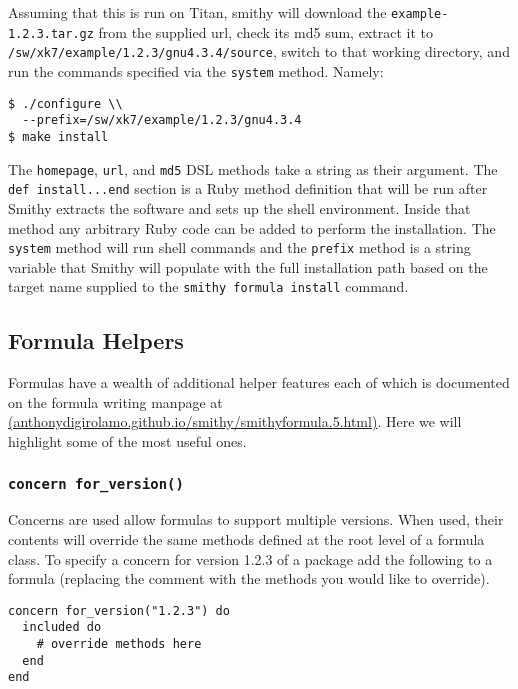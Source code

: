 \documentclass{acm_proc_article-sp}
\begin{document}
Assuming that this is run on Titan, smithy will download the
\texttt{example-1.2.3.tar.gz} from the supplied url, check its md5 sum, extract
it to \texttt{/sw/xk7/example/1.2.3/gnu4.3.4/source}, switch to that working
directory, and run the commands specified via the \texttt{system} method.
Namely:

\begin{quoting}
\begin{verbatim}
$ ./configure \\
  --prefix=/sw/xk7/example/1.2.3/gnu4.3.4
$ make install
\end{verbatim}
\end{quoting}

The \texttt{homepage}, \texttt{url}, and \texttt{md5} DSL methods take a string
as their argument. The \texttt{def install...end} section is a Ruby method
definition that will be run after Smithy extracts the software and sets up the
shell environment. Inside that method any arbitrary Ruby code can be added to
perform the installation. The \texttt{system} method will run shell commands and
the \texttt{prefix} method is a string variable that Smithy will populate with
the full installation path based on the target name supplied to the
\texttt{smithy formula install} command.

\subsection{Formula Helpers}

Formulas have a wealth of additional helper features each of which is documented
on the formula writing manpage at \\
\href{http://anthonydigirolamo.github.io/smithy/smithyformula.5.html}{(anthonydigirolamo.github.io/smithy/smithyformula.5.html)}.
Here we will highlight some of the most useful ones.

\subsubsection{\texttt{concern for\_version()}}

Concerns are used allow formulas to support multiple versions. When used, their
contents will override the same methods defined at the root level of a formula
class. To specify a concern for version 1.2.3 of a package add the following to
a formula (replacing the comment with the methods you would like to override).

\begin{quoting}
\begin{verbatim}
concern for_version("1.2.3") do
  included do
    # override methods here
  end
end
\end{verbatim}
\end{quoting}
\end{document}
